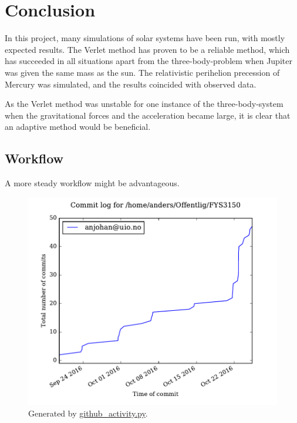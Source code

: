 \documentclass[12pt,english,a4paper]{article}
\begin{document}
\section{Conclusion}
In this project, many simulations of solar systems have been run, with mostly expected results. The Verlet method has proven to be a reliable method, which has succeeded in all situations apart from the three-body-problem when Jupiter was given the same mass as the sun. The relativistic perihelion precession of Mercury was simulated, and the results coincided with observed data.

As the Verlet method was unstable for one instance of the three-body-system when the gravitational forces and the acceleration became large, it is clear that an adaptive method would be beneficial.

\subsection{Workflow}
A more steady workflow might be advantageous.
\begin{figure}[H]
\centering
\includegraphics{gitlog.pdf}
\caption{Generated by \href{https://github.com/anjohan/Offentlig/blob/master/FYS3150/github\_activity.py}{github\_activity.py}.}
\end{figure}

\clearpage
{}
\printbibliography
\end{document}
